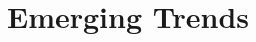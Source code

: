 \newpage
\section{Emerging Trends}
\label{Emerging Trends}
\begin{NexMainBox}
        \begin{NexMainBox}
        \end{NexMainBox}
        \begin{NexMainBox}
        \end{NexMainBox}
\end{NexMainBox}

